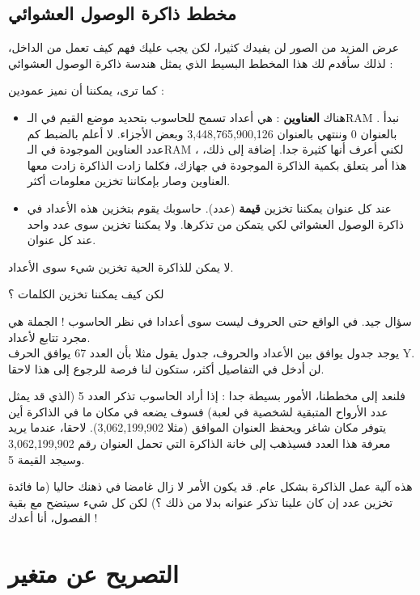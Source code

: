 \subsection{مخطط ذاكرة الوصول العشوائي}

عرض المزيد من الصور لن يفيدك كثيرا، لكن يجب عليك فهم كيف تعمل من الداخل، لذلك سأقدم لك هذا المخطط البسيط الذي يمثل هندسة ذاكرة الوصول العشوائي :


كما ترى، يمكننا أن نميز عمودين :

\begin{itemize}
  \item هناك
\textbf{العناوين}
: هي أعداد تسمح للحاسوب بتحديد موضع القيم في الـ\textenglish{RAM}
. نبدأ بالعنوان 0 وننتهي بالعنوان 3,448,765,900,126 وبعض الأجزاء. لا أعلم بالضبط كم عدد العناوين الموجودة في الـ\textenglish{RAM}
، لكني أعرف أنها كثيرة جدا. إضافة إلى ذلك، هذا أمر يتعلق بكمية الذاكرة الموجودة في جهازك، فكلما زادت الذاكرة زادت معها العناوين وصار بإمكاننا تخزين معلومات أكثر.
  \item عند كل عنوان يمكننا تخزين
\textbf{قيمة}
(عدد). حاسوبك يقوم بتخزين هذه الأعداد في ذاكرة الوصول العشوائي لكي يتمكن من تذكرها. ولا يمكننا تخزين سوى عدد واحد عند كل عنوان.
\end{itemize}

لا يمكن للذاكرة الحية تخزين شيء سوى الأعداد.

\begin{question}
  لكن كيف يمكننا تخزين الكلمات ؟
\end{question}

سؤال جيد. في الواقع حتى الحروف ليست سوى أعدادا في نظر الحاسوب ! الجملة هي مجرد تتابع لأعداد.\\
يوجد جدول يوافق بين الأعداد والحروف، جدول يقول مثلا بأن العدد 67 يوافق الحرف
\textenglish{Y}.
لن أدخل في التفاصيل أكثر، ستكون لنا فرصة للرجوع إلى هذا لاحقا.

فلنعد إلى مخططنا، الأمور بسيطة جدا : إذا أراد الحاسوب تذكر العدد 5 (الذي قد يمثل عدد الأرواح المتبقية لشخصية في لعبة) فسوف يضعه في مكان ما في الذاكرة أين يتوفر مكان شاغر ويحفظ العنوان الموافق (مثلا 3,062,199,902). لاحقا، عندما يريد معرفة هذا العدد فسيذهب إلى خانة الذاكرة التي تحمل العنوان رقم 3,062,199,902 وسيجد القيمة 5.

هذه آلية عمل الذاكرة بشكل عام. قد يكون الأمر لا زال غامضا في ذهنك حاليا (ما فائدة تخزين عدد إن كان علينا تذكر عنوانه بدلا من ذلك ؟) لكن كل شيء سيتضح مع بقية الفصول، أنا أعدك !

\section{التصريح عن متغير}

